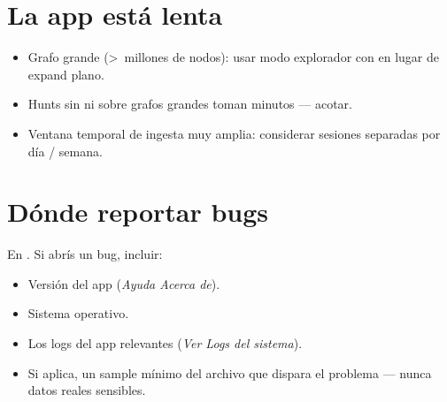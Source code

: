 \section{La app está lenta}

\begin{itemize}
    \item Grafo grande (\textgreater~millones de nodos): usar
    modo explorador con  en lugar de expand
    plano.
    \item Hunts sin  ni  sobre grafos grandes
    toman minutos — acotar.
    \item Ventana temporal de ingesta muy amplia: considerar
    sesiones separadas por día / semana.
\end{itemize}

\section{Dónde reportar bugs}

En . Si
abrís un bug, incluir:

\begin{itemize}
    \item Versión del app (\emph{Ayuda \textrightarrow{} Acerca
    de}).
    \item Sistema operativo.
    \item Los logs del app relevantes (\emph{Ver \textrightarrow{}
    Logs del sistema}).
    \item Si aplica, un sample mínimo del archivo que dispara el
    problema — nunca datos reales sensibles.
\end{itemize}
